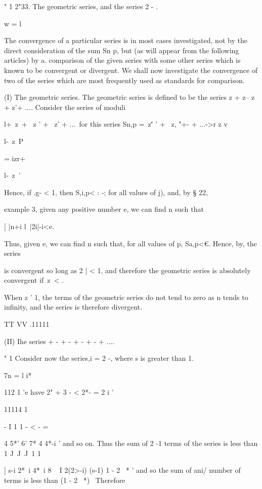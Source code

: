 " 1 2"33. The geometric series, and the series 2 - .

w = l

The convergence of a particular series is in most cases investigated,
not by the direct consideration of the sum Sn p, but (as will appear
from the following articles) by a. comparison of the given series with
some other series which is known to be convergent or divergent. We
shall now investigate the convergence of two of the series which are
most frequently used as standards for comparison.

%
%

(I) The geometric series. The geometric series is defined to be the
series z + z-- z + z'+ .... Consider the series of moduli

l+\ z\ + \ z ' + \ z' + ...\ for this series Sn,p =\ z\'' ' + \ z, "+-
+ ...->r z v

l-\ z\ P

= izr+

l-\ z\ '

Hence, if .g- < 1, then S,i,p< : -; for all values of j), and, by §
22,

example 3, given any positive number e, we can find n such that

[ |n+i l\ |2i|-i<e.

Thus, given e, we can find n such that, for all values of p, Sa,p<€.
Hence, by, the series

is convergent so long as 2 | < 1, and therefore the geometric series
is absolutely convergent if\ z\ < .

When z ' 1, the terms of the geometric series do not tend to zero as n
tends to infinity, and the series is therefore divergent.

TT VV .11111

(II) Ihe series + - + - + - + - + ....

" 1 Consider now the series,i = 2 -, where s is greater than 1.

7n = l i*

112 1 'e have 2" + 3 - < 2*- = 2 i '

11114 1

- I 1 1 - < - =

4 5*' 6' 7* 4 4*-i ' and so on. Thus the sum of 2 -1 terms of the
series is less than 1 J\ J\ J\ 1 1

] s-i 2*~i 4*~i 8 ~  I 2(2>-i) (s-1) 1 - 2 ~* ' and so the sum of
ani/ number of terms is less than (1 - 2 ~*)~ Therefore

